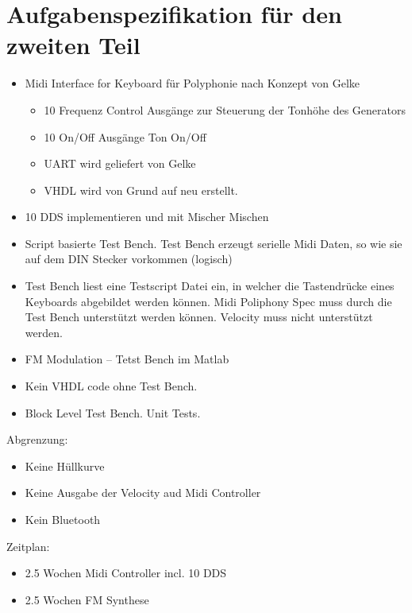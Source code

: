 \chapter{Aufgabenspezifikation für den zweiten Teil}\label{chap.anhang_aufgabenstellung_neu}

\begin{itemize}
	\item Midi Interface for Keyboard für Polyphonie nach Konzept von Gelke
	\begin{itemize}
    	\item 10 Frequenz Control Ausgänge zur Steuerung der Tonhöhe des Generators\\
    	\item 10 On/Off Ausgänge Ton On/Off\\
    	\item UART wird geliefert von Gelke\\
    	\item VHDL wird von Grund auf neu erstellt.
	\end{itemize}
	\item 10 DDS implementieren und mit Mischer Mischen
	\item Script basierte Test Bench. Test Bench erzeugt serielle Midi Daten, so wie sie auf dem DIN Stecker vorkommen (logisch)
	\item Test Bench liest eine Testscript Datei ein, in welcher die Tastendrücke eines Keyboards abgebildet werden können. Midi Poliphony Spec muss durch die Test Bench unterstützt werden können. Velocity muss nicht unterstützt werden.
	\item FM Modulation – Tetst Bench im Matlab
	\item Kein VHDL code ohne Test Bench.
	\item Block Level Test Bench. Unit Tests.
\end{itemize}  

Abgrenzung:

\begin{itemize}
	\item Keine Hüllkurve
	\item Keine Ausgabe der Velocity aud Midi Controller
	\item Kein Bluetooth
\end{itemize} 

Zeitplan:

\begin{itemize}
	\item 2.5 Wochen Midi Controller incl. 10 DDS
	\item 2.5 Wochen FM Synthese 
\end{itemize} 

